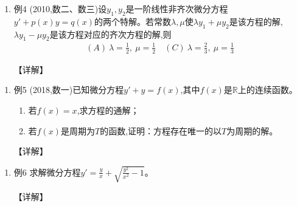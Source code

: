 \documentclass[12pt, a4paper, oneside, UTF8]{ctexbook}
\begin{document}
\begin{remark}
\end{remark}

\begin{enumerate}[label=\arabic*.,start=4]
    \item 例4 (2010,数二、数三)设$y_1,y_2$是一阶线性非齐次微分方程$y'+p(x)y=q(x)$的两个特解。若常数$\lambda,\mu$使$\lambda y_1+\mu y_2$是该方程的解,$\lambda y_1-\mu y_2$是该方程对应的齐次方程的解,则
    \begin{align*}
        (A)\ \lambda=\frac{1}{2},\ \mu=\frac{1}{2} \quad (C)\ \lambda=\frac{2}{3},\ \mu=\frac{1}{3}
    \end{align*}
    
    \begin{solution}
    【详解】
    \end{solution}
\end{enumerate}

\begin{remark}
\end{remark}

\begin{enumerate}[label=\arabic*.,start=5]
    \item 例5 (2018,数一)已知微分方程$y'+y=f(x)$,其中$f(x)$是$\mathbb{R}$上的连续函数。
    \begin{enumerate}[label=(\roman*)]
        \item 若$f(x)=x$,求方程的通解；
        \item 若$f(x)$是周期为$T$的函数,证明：方程存在唯一的以$T$为周期的解。
    \end{enumerate}
    
    \begin{solution}
    【详解】
    \end{solution}
\end{enumerate}

\begin{remark}
\end{remark}

\begin{enumerate}[label=\arabic*.,start=6]
    \item 例6 求解微分方程$y'=\frac{y}{x}+\sqrt{\frac{y^2}{x^2}-1}$。
    
    \begin{solution}
    【详解】
    \end{solution}
\end{enumerate}
\end{document}
